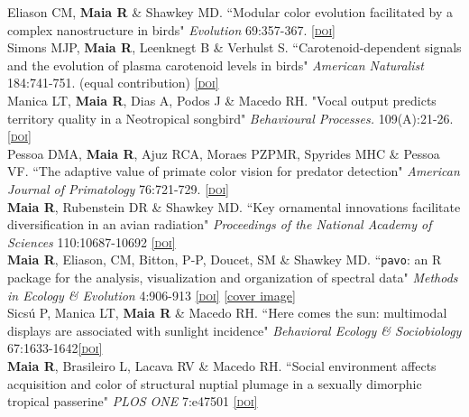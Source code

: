 \documentclass[10pt]{article}
\newcommand{\doi}[1]{\href{http://dx.doi.org/#1}{\scriptsize\textsc{[doi]}}}
\newcommand{\years}[1]{\marginnote{\raggedleft\scriptsize #1}}
\begin{document}
\years{2015} Eliason CM, \textbf{Maia R} \& Shawkey MD. “Modular color evolution facilitated by a complex nanostructure in birds" \emph{Evolution} 69:357-367. \doi{10.1111/evo.12575} \\

\years{2014} Simons MJP\dag, \textbf{Maia R\dag}, Leenknegt B \& Verhulst S. “Carotenoid-dependent signals and the evolution of plasma carotenoid levels in birds" \emph{American Naturalist} 184:741-751. (\dag equal contribution) \doi{10.1086/678402}\\

\years{} Manica LT, \textbf{Maia R}, Dias A, Podos J \& Macedo RH. "Vocal output predicts territory quality in a Neotropical songbird" \emph{Behavioural Processes.} 109(A):21-26. \doi{10.1016/j.beproc.2014.07.004}\\

\years{} Pessoa DMA, \textbf{Maia R}, Ajuz RCA, Moraes PZPMR, Spyrides MHC \& Pessoa VF. “The adaptive value of primate color vision for predator detection" \emph{American Journal of Primatology} 76:721-729. \doi{10.1002/ajp.22264}\\

\years{2013} \textbf{Maia R}, Rubenstein DR \& Shawkey MD. “Key ornamental innovations facilitate diversification in an avian radiation" \emph{Proceedings of the National Academy of Sciences} 110:10687-10692 \doi{10.1073/pnas.1220784110}\\

\years{}  \textbf{Maia R}, Eliason, CM, Bitton, P-P, Doucet, SM \& Shawkey MD. “\texttt{pavo}: an R package for the analysis, visualization and organization of spectral data" \emph{Methods in Ecology \& Evolution} 4:906-913 \doi{10.1111/2041-210X.12069} \href{http://www.methodsinecologyandevolution.org/view/0/covergallery.html#4-10}{\scriptsize{[cover image]}}\\

\years{} Sics\'{u} P, Manica LT,  \textbf{Maia R} \& Macedo RH. “Here comes the sun: multimodal displays are associated with sunlight incidence" \emph{Behavioral Ecology \& Sociobiology} 67:1633-1642\doi{10.1007/s00265-013-1574-x}\\

\years{2012}  \textbf{Maia R}, Brasileiro L, Lacava RV \& Macedo RH. “Social environment affects acquisition and color of structural nuptial plumage in a sexually dimorphic tropical passerine" \emph{PLOS ONE} 7:e47501 \doi{10.1371/journal.pone.0047501}\\
\end{document}
